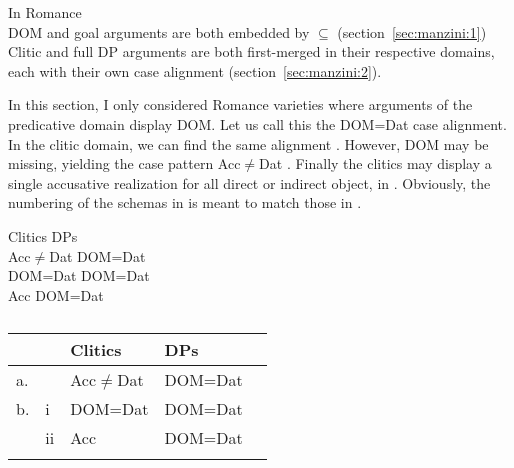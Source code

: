 \documentclass[output=paper,colorlinks,citecolor=brown]{./langscibook}
\begin{document}
\ea%
    \label{ex:manzini:29}
    In Romance\\
    \ea\label{ex:manzini:29a} 
    DOM and goal arguments are both embedded by ${\subseteq}$ (section~\ref{sec:manzini:1})\\
    \ex\label{ex:manzini:29b} 
    Clitic and full DP arguments are both first-merged in their respective domains, each with their own case alignment (section~\ref{sec:manzini:2}).
    \z
\z

In this section, I only considered Romance varieties where arguments of the predicative domain display DOM. Let us call this the DOM=Dat case alignment. In the clitic domain, we can find the same alignment . However, DOM may be missing, yielding the case pattern Acc${\neq}$Dat . Finally the clitics may display a single accusative realization for all direct or indirect object, in . Obviously, the numbering of the schemas in  is meant to match those in .

\ea%
    \label{ex:manzini:30}
    Clitics DPs \\
    \ea\label{ex:manzini:30a} 
    Acc${\neq}$Dat      DOM=Dat\\
    \ex\label{ex:manzini:30b} 
        \ea\label{ex:manzini:30bi} 
        DOM=Dat    DOM=Dat\\
        \ex\label{ex:manzini:30bii} 
        Acc        DOM=Dat \\
        \z
    \z
\z

\begin{table}
\caption{}\label{tab:manzini:3}
\begin{tabularx}{\textwidth}{XXXXX}
\lsptoprule
   &    & Clitics        & DPs     & \\
\midrule
a. &    & Acc${\neq}$Dat & DOM=Dat & \\
b. & i  & DOM=Dat        & DOM=Dat & \\
   & ii & Acc            & DOM=Dat & \\
\lspbottomrule
\end{tabularx}
\end{table}
\end{document}
